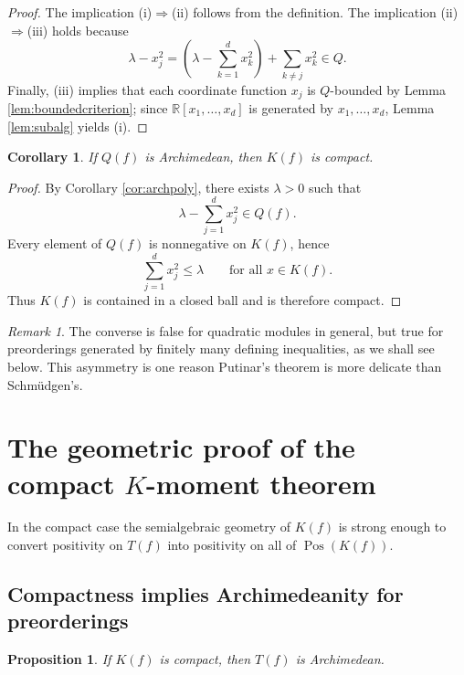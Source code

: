 \documentclass[11pt]{amsart}
\numberwithin{equation}{section}
\newtheorem{proposition}[theorem]{Proposition}
\newtheorem{corollary}[theorem]{Corollary}
\theoremstyle{definition}
\theoremstyle{remark}
\newtheorem{remark}[theorem]{Remark}
\newcommand{\R}{\mathbb{R}}
\newcommand{\Rxd}{\R[x_1,\dots,x_d]}
\newcommand{\Pos}{\operatorname{Pos}}
\newcommand{\1}{\mathbf{1}}
\begin{document}
\begin{proof}
The implication \textup{(i)}\(\Rightarrow\)\textup{(ii)} follows from the definition. The implication \textup{(ii)}\(\Rightarrow\)\textup{(iii)} holds because
\[
\lambda-x_j^2=\left(\lambda-\sum_{k=1}^d x_k^2\right)+\sum_{k\ne j}x_k^2\in Q.
\]
Finally, \textup{(iii)} implies that each coordinate function \(x_j\) is \(Q\)-bounded by Lemma \ref{lem:boundedcriterion}; since \(\Rxd\) is generated by \(x_1,\dots,x_d\), Lemma \ref{lem:subalg} yields \textup{(i)}.
\end{proof}

\begin{corollary}\label{cor:archcompact}
If \(Q(f)\) is Archimedean, then \(K(f)\) is compact.
\end{corollary}

\begin{proof}
By Corollary \ref{cor:archpoly}, there exists \(\lambda>0\) such that
\[
\lambda-\sum_{j=1}^d x_j^2\in Q(f).
\]
Every element of \(Q(f)\) is nonnegative on \(K(f)\), hence
\[
\sum_{j=1}^d x_j^2\le \lambda \qquad \text{for all }x\in K(f).
\]
Thus \(K(f)\) is contained in a closed ball and is therefore compact.
\end{proof}

\begin{remark}
The converse is false for quadratic modules in general, but true for preorderings generated by finitely many defining inequalities, as we shall see below. This asymmetry is one reason Putinar's theorem is more delicate than Schm\"udgen's.
\end{remark}

\section{The geometric proof of the compact \(K\)-moment theorem}\label{sec:compactgeom}

In the compact case the semialgebraic geometry of \(K(f)\) is strong enough to convert positivity on \(T(f)\) into positivity on all of \(\Pos(K(f))\).

\subsection{Compactness implies Archimedeanity for preorderings}

\begin{proposition}\label{prop:compactimpliesarch}
If \(K(f)\) is compact, then \(T(f)\) is Archimedean.
\end{proposition}
\end{document}
